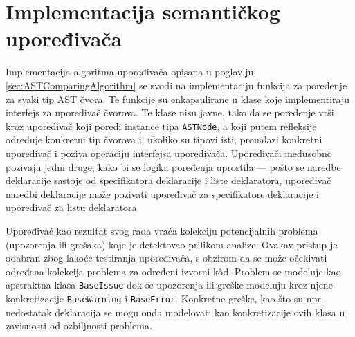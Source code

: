 \section{Implementacija semantičkog upoređivača}
\label{sec:ImplementationComparer}

Implementacija algoritma upoređivača opisana u poglavlju \ref{sec:ASTComparingAlgorithm} se svodi na implementaciju funkcija za poređenje za svaki tip AST čvora. Te funkcije su enkapsulirane u klase koje implementiraju interfejs za upoređivač čvorova. Te klase nisu javne, tako da se poređenje vrši kroz upoređivač koji poredi instance tipa \texttt{ASTNode}, a koji putem refleksije određuje konkretni tip čvorova i, ukoliko su tipovi isti, pronalazi konkretni upoređivač i poziva operaciju interfejsa upoređivača. Upoređivači međusobno pozivaju jedni druge, kako bi se logika poređenja uprostila --- pošto se naredbe deklaracije sastoje od specifikatora deklaracije i liste deklaratora, upoređivač naredbi deklaracije može pozivati upoređivač za specifikatore deklaracije i upoređivač za listu deklaratora. 

Upoređivač kao rezultat svog rada vraća kolekciju potencijalnih problema (upozorenja ili grešaka) koje je detektovao prilikom analize. Ovakav pristup je odabran zbog lakoće testiranja upoređivača, s obzirom da se može očekivati određena kolekcija problema za određeni izvorni k\^od. Problem se modeluje kao apstraktna klasa \texttt{BaseIssue} dok se upozorenja ili greške modeluju kroz njene konkretizacije \texttt{BaseWarning} i \texttt{BaseError}. Konkretne greške, kao što su npr. nedostatak deklaracija se mogu onda modelovati kao konkretizacije ovih klasa u zavisnosti od ozbiljnosti problema. 